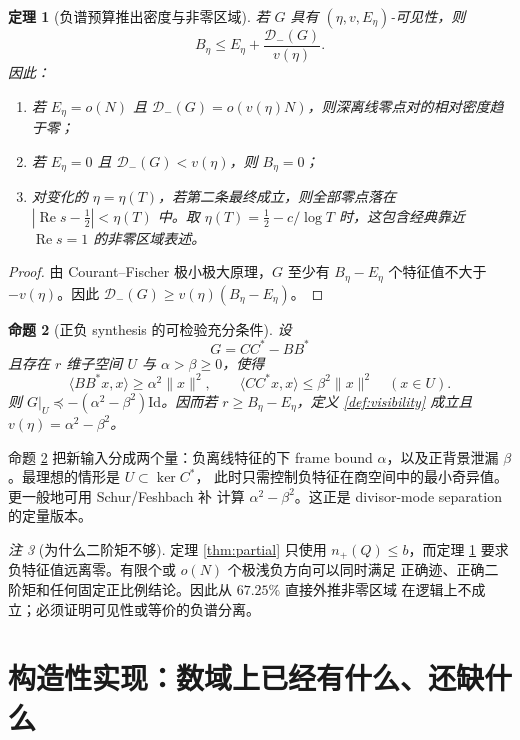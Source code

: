 \documentclass[UTF8,11pt,a4paper]{ctexart}
\newtheorem{theorem}{定理}[section]
\newtheorem{proposition}[theorem]{命题}
\theoremstyle{definition}
\theoremstyle{remark}
\newtheorem{remark}[theorem]{注}
\newcommand{\Id}{\mathrm{Id}}
\newcommand{\Rea}{\operatorname{Re}}
\begin{document}
\begin{theorem}[负谱预算推出密度与非零区域]\label{thm:region}
若 $G$ 具有 $(\eta,v,E_\eta)$-可见性，则
\begin{equation}\label{eq:deepcount}
 B_\eta\le E_\eta+\frac{\mathcal{D}_-(G)}{v(\eta)}.
\end{equation}
因此：
\begin{enumerate}
\item 若 $E_\eta=o(N)$ 且
$\mathcal{D}_-(G)=o(v(\eta)N)$，则深离线零点对的相对密度趋于零；
\item 若 $E_\eta=0$ 且 $\mathcal{D}_-(G)<v(\eta)$，则 $B_\eta=0$；
\item 对变化的 $\eta=\eta(T)$，若第二条最终成立，则全部零点落在
$|\Rea s-\tfrac12|<\eta(T)$ 中。取
$\eta(T)=\tfrac12-c/\log T$ 时，这包含经典靠近 $\Rea s=1$
的非零区域表述。
\end{enumerate}
\end{theorem}

\begin{proof}
由 Courant--Fischer 极小极大原理，$G$ 至少有
$B_\eta-E_\eta$ 个特征值不大于 $-v(\eta)$。因此
$\mathcal{D}_-(G)\ge v(\eta)(B_\eta-E_\eta)$。
\end{proof}

\begin{proposition}[正负 synthesis 的可检验充分条件]\label{prop:synthesis}
设
\[
 G=CC^*-BB^*
\]
且存在 $r$ 维子空间 $U$ 与 $\alpha>\beta\ge0$，使得
\[
 \langle BB^*x,x\rangle\ge\alpha^2\|x\|^2,\qquad
 \langle CC^*x,x\rangle\le\beta^2\|x\|^2\quad(x\in U).
\]
则 $G|_U\preceq-(\alpha^2-\beta^2)\Id$。因而若
$r\ge B_\eta-E_\eta$，定义 \ref{def:visibility} 成立且
$v(\eta)=\alpha^2-\beta^2$。
\end{proposition}

命题 \ref{prop:synthesis} 把新输入分成两个量：负离线特征的下 frame bound
$\alpha$，以及正背景泄漏 $\beta$。最理想的情形是 $U\subset\ker C^*$，
此时只需控制负特征在商空间中的最小奇异值。更一般地可用 Schur/Feshbach 补
计算 $\alpha^2-\beta^2$。这正是 divisor-mode separation 的定量版本。

\begin{remark}[为什么二阶矩不够]
定理 \ref{thm:partial} 只使用 $n_+(Q)\le b$，而定理
\ref{thm:region} 要求负特征值远离零。有限个或 $o(N)$ 个极浅负方向可以同时满足
正确迹、正确二阶矩和任何固定正比例结论。因此从 $67.25\%$ 直接外推非零区域
在逻辑上不成立；必须证明可见性或等价的负谱分离。
\end{remark}

\section{构造性实现：数域上已经有什么、还缺什么}
\end{document}
